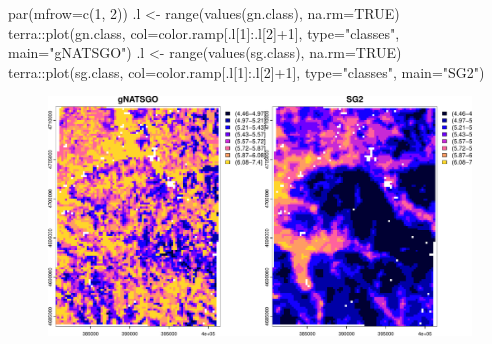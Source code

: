 \documentclass[
  letterpaper,
  DIV=11,
  numbers=noendperiod]{scrartcl}
\newenvironment{Shaded}{\begin{snugshade}}{\end{snugshade}}
\newcommand{\AttributeTok}[1]{\textcolor[rgb]{0.40,0.45,0.13}{#1}}
\newcommand{\ConstantTok}[1]{\textcolor[rgb]{0.56,0.35,0.01}{#1}}
\newcommand{\DecValTok}[1]{\textcolor[rgb]{0.68,0.00,0.00}{#1}}
\newcommand{\FunctionTok}[1]{\textcolor[rgb]{0.28,0.35,0.67}{#1}}
\newcommand{\NormalTok}[1]{\textcolor[rgb]{0.00,0.23,0.31}{#1}}
\newcommand{\OtherTok}[1]{\textcolor[rgb]{0.00,0.23,0.31}{#1}}
\newcommand{\SpecialCharTok}[1]{\textcolor[rgb]{0.37,0.37,0.37}{#1}}
\newcommand{\StringTok}[1]{\textcolor[rgb]{0.13,0.47,0.30}{#1}}
\begin{document}
\begin{Shaded}
\begin{Highlighting}[]
\FunctionTok{par}\NormalTok{(}\AttributeTok{mfrow=}\FunctionTok{c}\NormalTok{(}\DecValTok{1}\NormalTok{, }\DecValTok{2}\NormalTok{))}
\NormalTok{.l }\OtherTok{\textless{}{-}} \FunctionTok{range}\NormalTok{(}\FunctionTok{values}\NormalTok{(gn.class), }\AttributeTok{na.rm=}\ConstantTok{TRUE}\NormalTok{)}
\NormalTok{terra}\SpecialCharTok{::}\FunctionTok{plot}\NormalTok{(gn.class,}
            \AttributeTok{col=}\NormalTok{color.ramp[.l[}\DecValTok{1}\NormalTok{]}\SpecialCharTok{:}\NormalTok{.l[}\DecValTok{2}\NormalTok{]}\SpecialCharTok{+}\DecValTok{1}\NormalTok{], }\AttributeTok{type=}\StringTok{"classes"}\NormalTok{,}
            \AttributeTok{main=}\StringTok{"gNATSGO"}\NormalTok{)}
\NormalTok{.l }\OtherTok{\textless{}{-}} \FunctionTok{range}\NormalTok{(}\FunctionTok{values}\NormalTok{(sg.class), }\AttributeTok{na.rm=}\ConstantTok{TRUE}\NormalTok{)}
\NormalTok{terra}\SpecialCharTok{::}\FunctionTok{plot}\NormalTok{(sg.class,}
            \AttributeTok{col=}\NormalTok{color.ramp[.l[}\DecValTok{1}\NormalTok{]}\SpecialCharTok{:}\NormalTok{.l[}\DecValTok{2}\NormalTok{]}\SpecialCharTok{+}\DecValTok{1}\NormalTok{], }\AttributeTok{type=}\StringTok{"classes"}\NormalTok{,}
            \AttributeTok{main=}\StringTok{"SG2"}\NormalTok{)}
\end{Highlighting}
\end{Shaded}

\begin{figure}[H]

{\centering \includegraphics{PatternAnalysisWorkshopTutorial_files/figure-pdf/show.classified-hist-1.pdf}

}

\end{figure}
\end{document}

